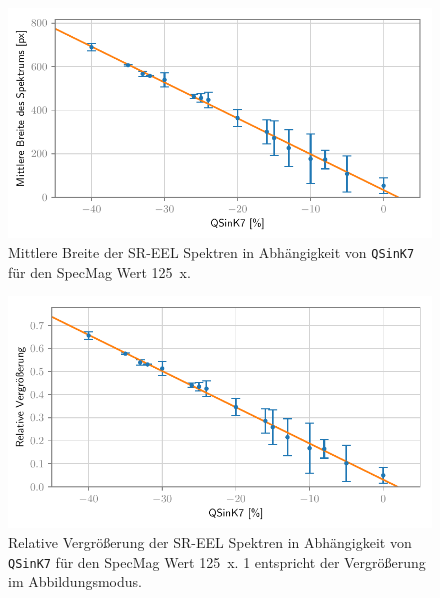 \documentclass[
	paper=a4,				%
	twoside=true,			%
	BCOR=6mm,				%
	fontsize=12pt,			%
	pagesize=auto,			%
	numbers=noenddot,		%
	bibliography=totoc,		%
	draft=false
]{scrartcl}
\begin{document}
\begin{figure}
	\centering
	\includegraphics[width=1\linewidth]{../../Jupyter-Notebooks/Kapitel2/Bilder/QSinK7_SM125_width-vs-QSinK7}
	\caption{Mittlere Breite der SR-EEL Spektren in Abhängigkeit von \texttt{QSinK7} für den SpecMag Wert \SI{125}{x}.}
	\label{fig:SR-EELS_Charakterisierung_QSinK7_SM125_QSinK7}
\end{figure}

\begin{figure}
	\centering
	\includegraphics[width=1\linewidth]{../../Jupyter-Notebooks/Kapitel2/Bilder/QSinK7_SM125_width-vs-QSinK7_norm}
	\caption{Relative Vergrößerung der SR-EEL Spektren in Abhängigkeit von \texttt{QSinK7} für den SpecMag Wert \SI{125}{x}. 1 entspricht der Vergrößerung im Abbildungsmodus.}
	\label{fig:SR-EELS_Charakterisierung_QSinK7_SM125_QSinK7_norm}
\end{figure}
\end{document}
